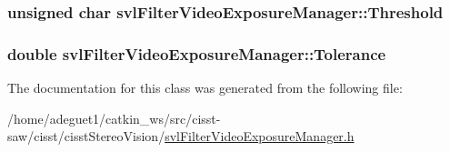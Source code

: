 \hypertarget{classsvl_filter_video_exposure_manager_ab2fc8e4a7d94af1976849d160ac946ba}{
\subsubsection[{Threshold}]{\setlength{\rightskip}{0pt plus 5cm}unsigned char svl\-Filter\-Video\-Exposure\-Manager\-::\-Threshold\hspace{0.3cm}{\ttfamily [protected]}}}\label{classsvl_filter_video_exposure_manager_ab2fc8e4a7d94af1976849d160ac946ba}
\hypertarget{classsvl_filter_video_exposure_manager_ade971b6b43879957865e69fb76a045e3}{
\subsubsection[{Tolerance}]{\setlength{\rightskip}{0pt plus 5cm}double svl\-Filter\-Video\-Exposure\-Manager\-::\-Tolerance\hspace{0.3cm}{\ttfamily [protected]}}}\label{classsvl_filter_video_exposure_manager_ade971b6b43879957865e69fb76a045e3}


The documentation for this class was generated from the following file\-:\begin{DoxyCompactItemize}
\item 
/home/adeguet1/catkin\-\_\-ws/src/cisst-\/saw/cisst/cisst\-Stereo\-Vision/\hyperlink{svl_filter_video_exposure_manager_8h}{svl\-Filter\-Video\-Exposure\-Manager.\-h}\end{DoxyCompactItemize}
